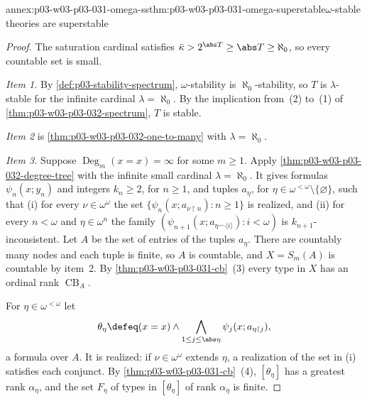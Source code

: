 \begin{annexitem}{annex:p03-w03-p03-031-omega-ss}{thm:p03-w03-p03-031-omega-superstable}{\(\omega\)-stable theories are superstable}
\begin{proof}
The saturation cardinal satisfies \(\bar\kappa>2^{\abs T}\geq\abs T\geq
\aleph_0\), so every countable set is small.

\emph{Item 1.}  By \cref{def:p03-stability-spectrum}, \(\omega\)-stability
is \(\aleph_0\)-stability, so \(T\) is \(\lambda\)-stable for the infinite
cardinal \(\lambda=\aleph_0\).  By the implication from~(2) to~(1) of
\cref{thm:p03-w03-p03-032-spectrum}, \(T\) is stable.

\emph{Item 2} is \cref{thm:p03-w03-p03-032-one-to-many} with
\(\lambda=\aleph_0\).

\emph{Item 3.}  Suppose \(\operatorname{Deg}_m(x=x)=\infty\) for some
\(m\geq1\).  Apply \cref{thm:p03-w03-p03-032-degree-tree} with the
infinite small cardinal \(\lambda=\aleph_0\).  It gives formulas
\(\psi_n(x;y_n)\) and integers \(k_n\geq2\), for \(n\geq1\), and tuples
\(a_\eta\), for \(\eta\in\omega^{<\omega}\setminus\{\varnothing\}\), such
that (i) for every \(\nu\in\omega^\omega\) the set
\(\{\psi_n(x;a_{\nu\mathbin{\upharpoonright}n}):n\geq1\}\) is realized, and
(ii) for every \(n<\omega\) and \(\eta\in\omega^n\) the family
\((\psi_{n+1}(x;a_{\eta\frown\langle i\rangle}):i<\omega)\) is
\(k_{n+1}\)-inconsistent.  Let \(A\) be the set of entries of the tuples
\(a_\eta\).  There are countably many nodes and each tuple is finite, so
\(A\) is countable, and \(X=S_m(A)\) is countable by item~2.  By
\cref{thm:p03-w03-p03-031-cb}~(3) every type in \(X\) has an ordinal rank
\(\operatorname{CB}_A\).

For \(\eta\in\omega^{<\omega}\) let
\[
 \theta_\eta\defeq(x=x)\wedge\bigwedge_{1\leq j\leq\abs\eta}
 \psi_j(x;a_{\eta\mathbin{\upharpoonright}j}),
\]
a formula over \(A\).  It is realized: if \(\nu\in\omega^\omega\) extends
\(\eta\), a realization of the set in (i) satisfies each conjunct.  By
\cref{thm:p03-w03-p03-031-cb}~(4), \([\theta_\eta]\) has a greatest rank
\(\alpha_\eta\), and the set \(F_\eta\) of types in \([\theta_\eta]\) of
rank \(\alpha_\eta\) is finite.


\end{proof}
\end{annexitem}
